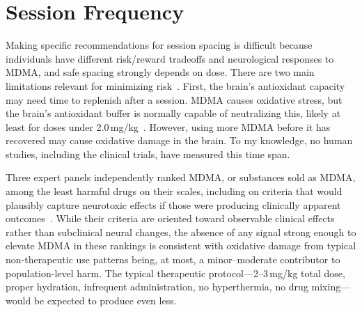\documentclass[11pt,oneside]{book}
\let\cite\parencite
\begin{document}
\section{Session Frequency}
\label{frequency}
Making specific recommendations for session spacing is difficult because individuals have different risk/reward tradeoffs and neurological responses to MDMA, and safe spacing strongly depends on dose. There are two main limitations relevant for minimizing risk~\cite{baggottSerotonin,baggottDamage}. First, the brain's antioxidant capacity may need time to replenish after a session. MDMA causes oxidative stress, but the brain's antioxidant buffer is normally capable of neutralizing this, likely at least for doses under 2.0\,mg/kg~\cite{baggottSupplements}. However, using more MDMA before it has recovered may cause oxidative damage in the brain. To my knowledge, no human studies, including the clinical trials, have measured this time span.

Three expert panels independently ranked MDMA, or substances sold as MDMA, among the least harmful drugs on their scales, including on criteria that would plausibly capture neurotoxic effects if those were producing clinically apparent outcomes~\cite{nuttDrugHarms,bonomoHarms,crossinHarms}. While their criteria are oriented toward observable clinical effects rather than subclinical neural changes, the absence of any signal strong enough to elevate MDMA in these rankings is consistent with oxidative damage from typical non-therapeutic use patterns being, at most, a minor--moderate contributor to population-level harm. The typical therapeutic protocol---2--3\,mg/kg total dose, proper hydration, infrequent administration, no hyperthermia, no drug mixing---would be expected to produce even less.
\end{document}
